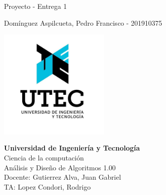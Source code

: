\begin{titlepage}
    \begin{center}
        \vspace*{1cm}
            
        \Huge
        Proyecto - Entrega 1
            
        \vspace{1cm}
        \Large
        Domínguez Aspilcueta, Pedro Francisco - 201910375\\
            
        \vfill
            
        \includegraphics[width=0.4\textwidth]{logo.jpg}
            
        \normalsize
        \textbf{Universidad de Ingeniería y Tecnología}\\
        Ciencia de la computación\\
        Análisis y Diseño de Algoritmos 1.00\\
        Docente: Gutierrez Alva, Juan Gabriel\\
        TA: Lopez Condori, Rodrigo\\
    \end{center}
\end{titlepage}